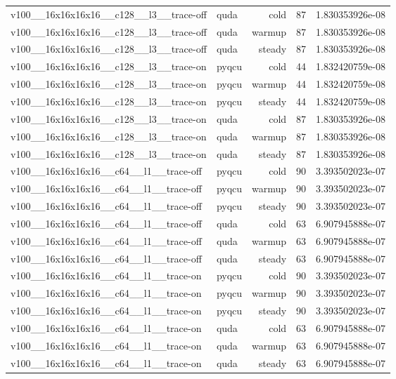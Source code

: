\begin{table}[htbp]
\begin{tabular}{@{}llrrr@{}}
v100\_\_16x16x16x16\_\_c128\_\_l3\_\_trace-off & quda & cold & 87 & 1.830353926e-08 \\
v100\_\_16x16x16x16\_\_c128\_\_l3\_\_trace-off & quda & warmup & 87 & 1.830353926e-08 \\
v100\_\_16x16x16x16\_\_c128\_\_l3\_\_trace-off & quda & steady & 87 & 1.830353926e-08 \\
v100\_\_16x16x16x16\_\_c128\_\_l3\_\_trace-on & pyqcu & cold & 44 & 1.832420759e-08 \\
v100\_\_16x16x16x16\_\_c128\_\_l3\_\_trace-on & pyqcu & warmup & 44 & 1.832420759e-08 \\
v100\_\_16x16x16x16\_\_c128\_\_l3\_\_trace-on & pyqcu & steady & 44 & 1.832420759e-08 \\
v100\_\_16x16x16x16\_\_c128\_\_l3\_\_trace-on & quda & cold & 87 & 1.830353926e-08 \\
v100\_\_16x16x16x16\_\_c128\_\_l3\_\_trace-on & quda & warmup & 87 & 1.830353926e-08 \\
v100\_\_16x16x16x16\_\_c128\_\_l3\_\_trace-on & quda & steady & 87 & 1.830353926e-08 \\
v100\_\_16x16x16x16\_\_c64\_\_l1\_\_trace-off & pyqcu & cold & 90 & 3.393502023e-07 \\
v100\_\_16x16x16x16\_\_c64\_\_l1\_\_trace-off & pyqcu & warmup & 90 & 3.393502023e-07 \\
v100\_\_16x16x16x16\_\_c64\_\_l1\_\_trace-off & pyqcu & steady & 90 & 3.393502023e-07 \\
v100\_\_16x16x16x16\_\_c64\_\_l1\_\_trace-off & quda & cold & 63 & 6.907945888e-07 \\
v100\_\_16x16x16x16\_\_c64\_\_l1\_\_trace-off & quda & warmup & 63 & 6.907945888e-07 \\
v100\_\_16x16x16x16\_\_c64\_\_l1\_\_trace-off & quda & steady & 63 & 6.907945888e-07 \\
v100\_\_16x16x16x16\_\_c64\_\_l1\_\_trace-on & pyqcu & cold & 90 & 3.393502023e-07 \\
v100\_\_16x16x16x16\_\_c64\_\_l1\_\_trace-on & pyqcu & warmup & 90 & 3.393502023e-07 \\
v100\_\_16x16x16x16\_\_c64\_\_l1\_\_trace-on & pyqcu & steady & 90 & 3.393502023e-07 \\
v100\_\_16x16x16x16\_\_c64\_\_l1\_\_trace-on & quda & cold & 63 & 6.907945888e-07 \\
v100\_\_16x16x16x16\_\_c64\_\_l1\_\_trace-on & quda & warmup & 63 & 6.907945888e-07 \\
v100\_\_16x16x16x16\_\_c64\_\_l1\_\_trace-on & quda & steady & 63 & 6.907945888e-07 \\

\end{tabular}
\end{table}
